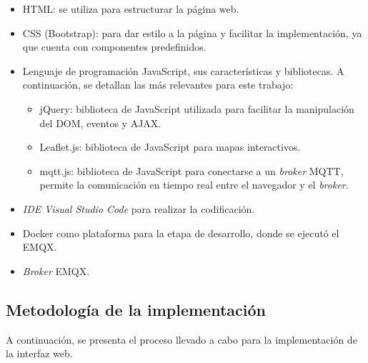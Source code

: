\begin{itemize}
	\item HTML: se utiliza para estructurar la página web.
	\item CSS (Bootstrap): para dar estilo a la página y facilitar la implementación, ya que cuenta con componentes predefinidos.
	\item Lenguaje de programación JavaScript, sus características y bibliotecas. A continuación, se detallan las más relevantes para este trabajo: 
		\begin{itemize}
			\item jQuery: biblioteca de JavaScript utilizada para facilitar la manipulación del DOM, eventos y AJAX.
			\item Leaflet.js: biblioteca de JavaScript para mapas interactivos.
			\item mqtt.js: biblioteca de JavaScript para conectarse a un \textit{broker} MQTT, permite la comunicación en tiempo real entre el navegador y el \textit{broker}.
		\end{itemize}
	\item \textit{IDE Visual Studio Code} para realizar la codificación. 
	\item Docker como plataforma para la etapa de desarrollo, donde se ejecutó el EMQX.
	\item \textit{Broker} EMQX. 
\end{itemize}


\subsection{Metodología de la implementación}
\label{sec:met_web}

A continuación, se presenta el proceso llevado a cabo para la implementación de la interfaz web. 

